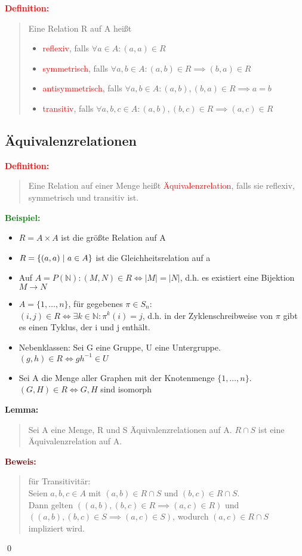 \documentclass{article}
\newcommand{\smsp}{\phantom{\hspace{3px}}}
\newcommand{\red}[1]{\textcolor{red}{#1}}
\newcommand{\green}[1]{\textcolor{green}{#1}}
\newcommand{\dgr}[1]{\textcolor{dgr}{#1}}
\newcommand{\maroon}[1]{\textcolor{maroon}{#1}}
\newcommand{\ex}{\green{\textbf{Beispiel: }}}
\newcommand{\de}[1]{\red{\textbf{Definition: }}\begin{quote}#1\end{quote}}
\newcommand{\lem}[1]{\dgr{\textbf{Lemma: }}\begin{quote}#1\end{quote}}
\newcommand{\pr}[1]{\maroon{\textbf{Beweis: }}\begin{quote}#1\end{quote}\qed}
\newcommand{\N}{\mathbb{N}}
\renewcommand{\st}{\smsp | \smsp}
\begin{document}
\de{
    Eine Relation R auf A heißt
    \begin{itemize}
        \item \red{reflexiv}, falls $\forall a \in A: (a,a) \in R$
        \item \red{symmetrisch}, falls $\forall a,b \in A: (a,b) \in R \implies (b,a) \in R$
        \item \red{antisymmetrisch}, falls $\forall a,b \in A: (a,b), (b,a) \in R \implies a = b$
        \item \red{transitiv}, falls $\forall a,b,c \in A: (a,b), (b,c) \in R \implies (a,c) \in R$
    \end{itemize}
}

\subsection{Äquivalenzrelationen}

\de{
    Eine Relation auf einer Menge heißt \red{Äquivalenzrelation}, falls sie reflexiv, symmetrisch und transitiv ist.
}

\ex \begin{itemize}
    \item $R = A \times A$ ist die größte Relation auf A
    \item $R = \{(a,a) \st a \in A\}$ ist die Gleichheitsrelation auf a
    \item Auf $A = P(\N): (M,N) \in R \iff |M| = |N|$, d.h. es existiert eine Bijektion $M \to N$
    \item $A = \{1, \dots, n\}$, für gegebenes $\pi \in S_n$:\\
    $(i,j) \in R \iff \exists k \in \N: \pi^k(i) = j$, d.h. in der Zyklenschreibweise von $\pi$ gibt es einen Tyklus, der i und j enthält.
    \item Nebenklassen: Sei G eine Gruppe, U eine Untergruppe. $(g,h) \in R \iff gh^{-1} \in U$
    \item Sei A die Menge aller Graphen mit der Knotenmenge $\{1, \dots, n\}$.\\
    $(G,H) \in R \iff G, H$ sind isomorph
\end{itemize}

\newpage
\lem{
    Sei A eine Menge, R und S Äquivalenzrelationen auf A. $R \cap S$ ist eine Äquivalenzrelation auf A.
}

\pr{
    für Transitivitär:\\
    Seien $a,b,c \in A$ mit $(a,b) \in R \cap S$ und $(b,c) \in R \cap S$.\\
    Dann gelten $((a,b),(b,c) \in R \implies (a,c) \in R)$ und\\
    $((a,b),(b,c) \in S \implies (a,c) \in S)$, wodurch $(a,c) \in R \cap S$ impliziert wird.
}
\end{document}
